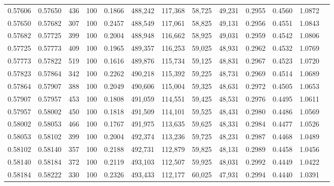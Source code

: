 \begin{tabular}{rrrrrrrrrrrrr}
0.57606 & 0.57650 &   436 & 100 &                                     0.1866 & 488,242 & 117,368 &  58,725 &  49,231 & 0.2955 & 0.4560 & 1.0872 \\
0.57650 & 0.57682 &   307 & 100 &                                     0.2457 & 488,549 & 117,061 &  58,825 &  49,131 & 0.2956 & 0.4551 & 1.0843 \\
0.57682 & 0.57725 &   399 & 100 &                                     0.2004 & 488,948 & 116,662 &  58,925 &  49,031 & 0.2959 & 0.4542 & 1.0806 \\
0.57725 & 0.57773 &   409 & 100 &                                     0.1965 & 489,357 & 116,253 &  59,025 &  48,931 & 0.2962 & 0.4532 & 1.0769 \\
0.57773 & 0.57822 &   519 & 100 &                                     0.1616 & 489,876 & 115,734 &  59,125 &  48,831 & 0.2967 & 0.4523 & 1.0720 \\
0.57823 & 0.57864 &   342 & 100 &                                     0.2262 & 490,218 & 115,392 &  59,225 &  48,731 & 0.2969 & 0.4514 & 1.0689 \\
0.57864 & 0.57907 &   388 & 100 &                                     0.2049 & 490,606 & 115,004 &  59,325 &  48,631 & 0.2972 & 0.4505 & 1.0653 \\
0.57907 & 0.57957 &   453 & 100 &                                     0.1808 & 491,059 & 114,551 &  59,425 &  48,531 & 0.2976 & 0.4495 & 1.0611 \\
0.57957 & 0.58002 &   450 & 100 &                                     0.1818 & 491,509 & 114,101 &  59,525 &  48,431 & 0.2980 & 0.4486 & 1.0569 \\
0.58002 & 0.58053 &   466 & 100 &                                     0.1767 & 491,975 & 113,635 &  59,625 &  48,331 & 0.2984 & 0.4477 & 1.0526 \\
0.58053 & 0.58102 &   399 & 100 &                                     0.2004 & 492,374 & 113,236 &  59,725 &  48,231 & 0.2987 & 0.4468 & 1.0489 \\
0.58102 & 0.58140 &   357 & 100 &                                     0.2188 & 492,731 & 112,879 &  59,825 &  48,131 & 0.2989 & 0.4458 & 1.0456 \\
0.58140 & 0.58184 &   372 & 100 &                                     0.2119 & 493,103 & 112,507 &  59,925 &  48,031 & 0.2992 & 0.4449 & 1.0422 \\
0.58184 & 0.58222 &   330 & 100 &                                     0.2326 & 493,433 & 112,177 &  60,025 &  47,931 & 0.2994 & 0.4440 & 1.0391 \\

\end{tabular}

